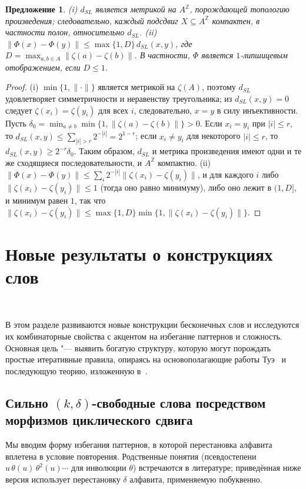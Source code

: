 \documentclass[a4paper,14pt]{extreport}
\theoremstyle{plain}
\newtheorem{proposition}[theorem]{Предложение}
\theoremstyle{definition}
\theoremstyle{remark}
\begin{document}
\begin{proposition}\label{propositionn1}
	(i) $d_{SL}$ является метрикой на $A^{\mathbb Z}$, порождающей топологию произведения; следовательно, каждый подсдвиг $X\subseteq A^{\mathbb Z}$ компактен, в частности полон, относительно $d_{SL}$.
	(ii) $\|\Phi(x)-\Phi(y)\|\le\max\{1,D\}\,d_{SL}(x,y)$, где $D=\max_{a,b\in A}\|\zeta(a)-\zeta(b)\|$. В частности, $\Phi$ является $1$-липшицевым отображением, если $D\le1$.
\end{proposition}
\begin{proof}
	(i) $\min\{1,\|\cdot\|\}$ является метрикой на $\zeta(A)$, поэтому $d_{SL}$ удовлетворяет симметричности и неравенству треугольника; из $d_{SL}(x,y)=0$ следует $\zeta(x_i)=\zeta(y_i)$ для всех $i$, следовательно, $x=y$ в силу инъективности.
	Пусть $\delta_0=\min_{a\ne b}\min\{1,\|\zeta(a)-\zeta(b)\|\}>0$. Если $x_i=y_i$ при $|i|\le r$, то $d_{SL}(x,y)\le\sum_{|i|>r}2^{-|i|}=2^{1-r}$;
	если $x_i\ne y_i$ для некоторого $|i|\le r$, то $d_{SL}(x,y)\ge2^{-r}\delta_0$. Таким образом, $d_{SL}$ и метрика произведения имеют одни и те же сходящиеся последовательности, и $A^{\mathbb Z}$ компактно.
	(ii) $\|\Phi(x)-\Phi(y)\|\le\sum_i2^{-|i|}\|\zeta(x_i)-\zeta(y_i)\|$, и для каждого $i$ либо $\|\zeta(x_i)-\zeta(y_i)\|\le1$ (тогда оно равно минимуму), либо оно лежит в $(1,D]$, и минимум равен $1$,
	так что $\|\zeta(x_i)-\zeta(y_i)\|\le\max\{1,D\}\min\{1,\|\zeta(x_i)-\zeta(y_i)\|\}$.
\end{proof}	
\section{Новые результаты о конструкциях слов}~\label{sec3.8}

В этом разделе развиваются новые конструкции бесконечных слов и исследуются их комбинаторные свойства с акцентом на избегание паттернов и сложность. Основная цель "--- выявить богатую структуру, которую могут порождать простые итеративные правила, опираясь на основополагающие работы 
Туэ~\cite{Thue} и последующую теорию, изложенную в~\cite{Lothaire2002, Allouche}.    
\subsection{Сильно \texorpdfstring{$(k,\delta)$}{(k,delta)}-свободные слова посредством морфизмов циклического сдвига}

Мы вводим форму избегания паттернов, в которой перестановка алфавита вплетена в условие повторения.
Родственные понятия (псевдостепени $u\,\theta(u)\,\theta^2(u)\cdots$ для инволюции $\theta$) встречаются в литературе; приведённая ниже версия использует
перестановку $\delta$ алфавита, применяемую побуквенно.
\end{document}
